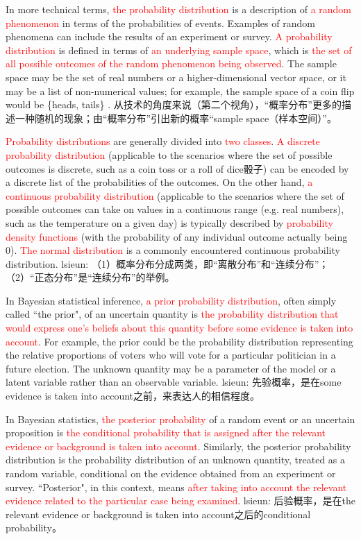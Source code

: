 \documentclass[UTF8]{ctexbook}
\begin{document}
In more technical terms, \textcolor{red}{the probability distribution} is a description of \textcolor{red}{a random phenomenon} in terms of the probabilities of events. Examples of random phenomena can include the results of an experiment or survey. \textcolor{red}{A probability distribution} is defined in terms of \textcolor{red}{an underlying sample space}, which is \textcolor{red}{the set of all possible outcomes of the random phenomenon being observed}. The sample space may be the set of real numbers or a higher-dimensional vector space, or it may be a list of non-numerical values; for example, the sample space of a coin flip would be \{heads, tails\} . 从技术的角度来说（第二个视角），“概率分布”更多的描述一种随机的现象；由“概率分布”引出新的概率“sample space（样本空间）”。

\textcolor{red}{Probability distributions} are generally divided into \textcolor{red}{two classes}. \textcolor{red}{A discrete probability distribution} (applicable to the scenarios where the set of possible outcomes is discrete, such as a coin toss or a roll of dice骰子) can be encoded by a discrete list of the probabilities of the outcomes. On the other hand, \textcolor{red}{a continuous probability distribution} (applicable to the scenarios where the set of possible outcomes can take on values in a continuous range (e.g. real numbers), such as the temperature on a given day) is typically described by \textcolor{red}{probability density functions} (with the probability of any individual outcome actually being 0). \textcolor{red}{The normal distribution} is a commonly encountered continuous probability distribution. lsieun: （1）概率分布分成两类，即“离散分布”和“连续分布”；（2）“正态分布”是“连续分布”的举例。

In Bayesian statistical inference, \textcolor{red}{a prior probability distribution}, often simply called ``the prior", of an uncertain quantity is \textcolor{red}{the probability distribution that would express one's beliefs about this quantity before some evidence is taken into account}. For example, the prior could be the probability distribution representing the relative proportions of voters who will vote for a particular politician in a future election. The unknown quantity may be a parameter of the model or a latent variable rather than an observable variable.  lsieun: 先验概率，是在some evidence is taken into account之前，来表达人的相信程度。

In Bayesian statistics,  \textcolor{red}{the posterior probability} of a random event or an uncertain proposition is  \textcolor{red}{the conditional probability that is assigned after the relevant evidence or background is taken into account}. Similarly, the posterior probability distribution is the probability distribution of an unknown quantity, treated as a random variable, conditional on the evidence obtained from an experiment or survey. ``Posterior", in this context, means \textcolor{red}{after taking into account the relevant evidence related to the particular case being examined}. lsieun: 后验概率，是在the relevant evidence or background is taken into account之后的conditional probability。
\end{document}

